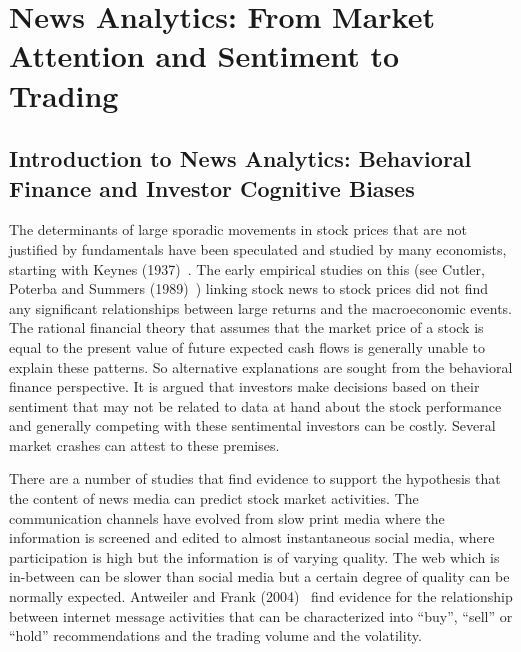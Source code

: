 \chapter{News Analytics: From Market Attention and Sentiment to Trading}

\section{Introduction to News Analytics: Behavioral Finance and Investor Cognitive Biases}
 
 The determinants of large sporadic movements in stock prices that are not justified by fundamentals have been speculated and studied by many economists, starting with Keynes (1937)~\cite{keynes1937general}. The early empirical studies on this (see Cutler, Poterba and Summers (1989)~\cite{cutler1988moves}) linking stock news to stock prices did not find any significant relationships between large returns and the macroeconomic events. The rational financial theory that assumes that the market price of a stock is equal to the present value of future expected cash flows is generally unable to explain these patterns. So alternative explanations are sought from the behavioral finance perspective. It is argued that investors make decisions based on their sentiment that may not be related to data at hand about the stock performance and generally competing with these sentimental investors can be costly. Several market crashes can attest to these premises.
 
 
 There are a number of studies that find evidence to support the hypothesis that the content of news media can predict stock market activities. The communication channels have evolved from slow print media where the information is screened and edited to almost instantaneous social media, where participation is high but the information is of varying quality. The web which is in-between can be slower than social media but a certain degree of quality can be normally expected. Antweiler and Frank (2004)~\cite{antweiler2004all} find evidence for the relationship between internet message activities that can be characterized into ``buy'', ``sell'' or ``hold'' recommendations and the trading volume and the volatility.
 

